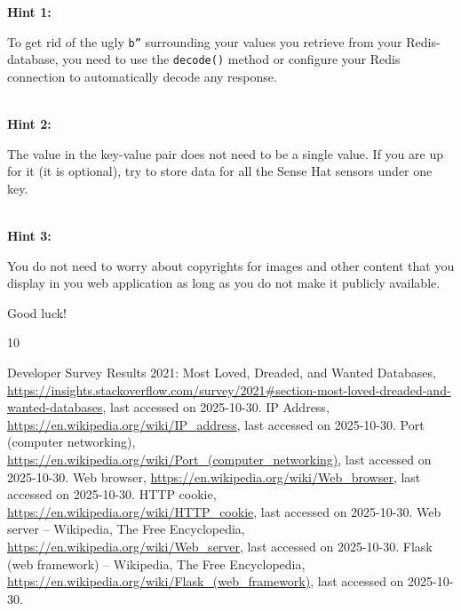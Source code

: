 \documentclass{article}
\begin{document}
{\bf Hint 1: }\parbox[t]{14cm}{To get rid of the ugly \texttt{b''} surrounding your values you retrieve from your Redis-database, you need to use the \texttt{decode()} method or configure your Redis connection to automatically decode any response.}\\
{\bf Hint 2: }\parbox[t]{14cm}{The value in the key-value pair does not need to be a single value. If you are up for it (it is optional), try to store data for all the Sense Hat sensors under one key.}\\
{\bf Hint 3: }\parbox[t]{14cm}{You do not need to worry about copyrights for images and other content that you display in you web application as long as you do not make it publicly available.}

\vspace{1cm}
\begin{center}
\huge Good luck!
\end{center}

\begin{thebibliography}{10}

 Developer Survey Results 2021: Most Loved, Dreaded, and Wanted Databases, \url{https://insights.stackoverflow.com/survey/2021#section-most-loved-dreaded-and-wanted-databases}, last accessed on 2025-10-30.
 IP Address, \url{https://en.wikipedia.org/wiki/IP_address}, last accessed on 2025-10-30.
 Port (computer networking), \url{https://en.wikipedia.org/wiki/Port_(computer_networking)}, last accessed on 2025-10-30.
 Web browser, \url{https://en.wikipedia.org/wiki/Web_browser}, last accessed on 2025-10-30.
 HTTP cookie, \url{https://en.wikipedia.org/wiki/HTTP_cookie}, last accessed on 2025-10-30.
 Web server -- Wikipedia, The Free Encyclopedia, \url{https://en.wikipedia.org/wiki/Web_server}, last accessed on 2025-10-30.
 Flask (web framework) -- Wikipedia, The Free Encyclopedia, \url{https://en.wikipedia.org/wiki/Flask_(web_framework)}, last accessed on 2025-10-30.
\end{thebibliography}
\end{document}
